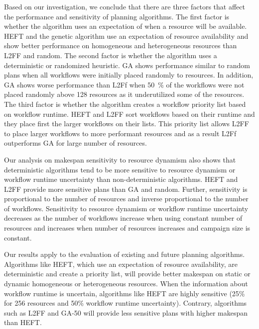 Based on our investigation, we conclude that there are three factors that affect the performance and sensitivity of planning algorithms.
The first factor is whether the algorithm uses an expectation of when a resource will be available.
HEFT and the genetic algorithm use an expectation of resource availability and show better performance on homogeneous and heterogeneous resources than L2FF and random.
The second factor is whether the algorithm uses a deterministic or randomized heuristic.
GA shows performance similar to random plans when all workflows were initially placed randomly to resources.
In addition, GA shows worse performance than L2Ff when 50~\% of the workflows were not placed randomly above 128 resources as it underutilized some of the resources.
The third factor is whether the algorithm creates a workflow priority list based on workflow runtime.
HEFT and L2FF sort workflows based on their runtime and they place first the larger workflows on their lists.
This priority list allows L2FF to place larger workflows to more performant resources and as a result L2Ff outperforms GA for large number of resources.

Our analysis on makespan sensitivity to resource dynamism also shows that deterministic algorithms tend to be more sensitive to resource dynamism or workflow runtime uncertainty than non-deterministic algorithms.
HEFT and L2FF provide more sensitive plans than GA and random.
Further, sensitivity is proportional to the number of resources and inverse proportional to the number of workflows.
Sensitivity to resource dynamism or workflow runtime uncertainty decreases as the number of workflows increase when using constant number of resources and increases when number of resources increases and campaign size is constant.

Our results apply to the evaluation of existing and future planning algorithms.
Algorithms like HEFT, which use an expectation of resource availability, are deterministic and create a priority list, will provide better makespan on static or dynamic homogeneous or heterogeneous resources.
When the information about workflow runtime is uncertain, algorithms like HEFT are highly sensitive (25\% for 256 resources and 50\% workflow runtime uncertainty).
Contrary, algorithms such as L2FF and GA-50 will provide less sensitive plans with higher makespan than HEFT.

